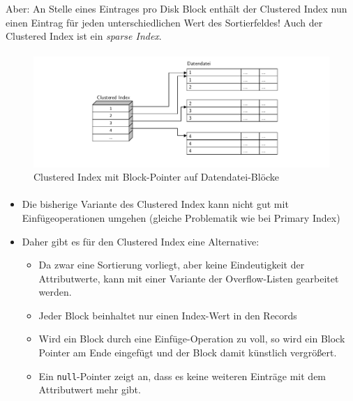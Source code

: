 {\begin{frame}{\insertsection}
\begin{itemize}
		\alert{Aber: An Stelle eines Eintrages pro Disk Block enthält der Clustered Index nun einen Eintrag für jeden unterschiedlichen Wert des Sortierfeldes! Auch der Clustered Index ist ein \textit{sparse Index}}.	
	\end{itemize}
\end{frame}
%
\begin{frame}{\insertsection}
	\framesubtitle{\insertsubsection}
	\begin{figure}
	\includegraphics[width=350pt]{img/ClusteredIndex.pdf}
	\caption{Clustered Index mit Block-Pointer auf Datendatei-Blöcke}
	\end{figure}
\end{frame}
%
\begin{frame}{\insertsection}
	\framesubtitle{\insertsubsection}
	\begin{itemize}
	\item Die bisherige Variante des Clustered Index kann nicht gut mit Einfügeoperationen umgehen (gleiche Problematik wie bei Primary Index)
	\item Daher gibt es für den Clustered Index eine Alternative: 
	\begin{itemize}
		\item Da zwar eine Sortierung vorliegt, aber keine Eindeutigkeit der Attributwerte, kann mit einer Variante der Overflow-Listen gearbeitet werden.
		\item Jeder Block beinhaltet nur einen Index-Wert in den Records
		\item Wird ein Block durch eine Einfüge-Operation zu voll, so wird ein Block Pointer am Ende eingefügt und der Block damit künstlich vergrößert.
		\item Ein \texttt{null}-Pointer zeigt an, dass es keine weiteren Einträge mit dem Attributwert mehr gibt.
	\end{itemize}
	\end{itemize}
\end{frame}
%
\begin{frame}{\insertsection}
	\framesubtitle{\insertsubsection}

\end{frame}}
